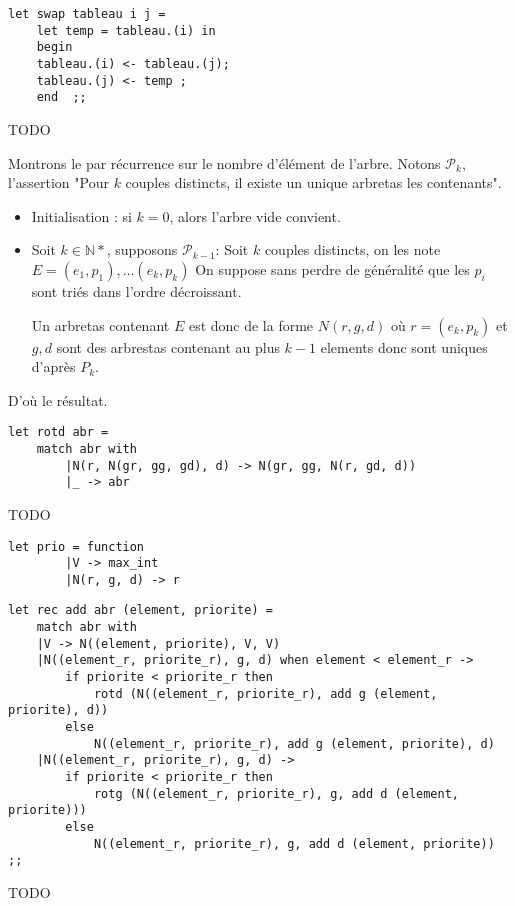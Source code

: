 \documentclass{article}
\newcommand{\bb}[1]{\mathbb{#1}}
\begin{document}
\begin{question}

    \item \begin{verbatim}
let swap tableau i j =
    let temp = tableau.(i) in
    begin
    tableau.(i) <- tableau.(j);
    tableau.(j) <- temp ;
    end  ;;
\end{verbatim}

    \item TODO

    \item Montrons le par récurrence sur le nombre d'élément de l'arbre.
Notons $\mathcal{P}_k$, l'assertion "Pour $k$ couples distincts, il existe un unique
arbretas les contenants".

    \begin{itemize}
        \item Initialisation : si $k = 0$, alors l'arbre vide convient.

        \item Soit $k \in \bb{N*}$, supposons $\mathcal{P}_{k - 1}$:
            Soit $k$ couples distincts, on les note 
            $E = (e_1, p_1), \dots (e_k, p_k)$
            On suppose sans perdre de généralité que les $p_i$ sont triés dans l'ordre
            décroissant.
            
            Un arbretas contenant $E$ est donc de la forme $N(r, g, d)$ où $r = (e_k, p_k)$
            et $g, d$ sont des arbrestas contenant au plus $k - 1$ elements donc sont 
            uniques d'après $P_k$. 
    \end{itemize}
     D'où le résultat.

    \item \begin{verbatim}
let rotd abr = 
    match abr with
        |N(r, N(gr, gg, gd), d) -> N(gr, gg, N(r, gd, d))
        |_ -> abr
    \end{verbatim}

    \item TODO

    \item \begin{verbatim}
let prio = function
        |V -> max_int
        |N(r, g, d) -> r
    \end{verbatim}

    \item \begin{verbatim}
let rec add abr (element, priorite) = 
    match abr with
    |V -> N((element, priorite), V, V)
    |N((element_r, priorite_r), g, d) when element < element_r ->
        if priorite < priorite_r then 
            rotd (N((element_r, priorite_r), add g (element, priorite), d))
        else 
            N((element_r, priorite_r), add g (element, priorite), d)
    |N((element_r, priorite_r), g, d) ->
        if priorite < priorite_r then 
            rotg (N((element_r, priorite_r), g, add d (element, priorite)))
        else 
            N((element_r, priorite_r), g, add d (element, priorite))
;;
    \end{verbatim} 

    \item TODO \begin{verbatim}

    \end{verbatim} 
\end{question}
\end{document}
